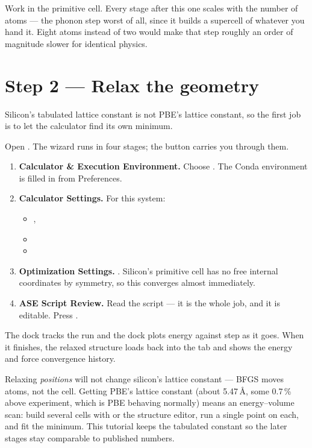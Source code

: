 \begin{caltip}
Work in the primitive cell. Every stage after this one scales with the number
of atoms --- the phonon step worst of all, since it builds a supercell of
whatever you hand it. Eight atoms instead of two would make that step roughly
an order of magnitude slower for identical physics.
\end{caltip}

\section{Step 2 --- Relax the geometry}

Silicon's tabulated lattice constant is not PBE's lattice constant, so the
first job is to let the calculator find its own minimum.

Open \menusep{}. The wizard
runs in four stages; the  button carries you through them.

\begin{enumerate}
  \item \textbf{Calculator \& Execution Environment.} Choose . The
    Conda environment is filled in from Preferences.
  \item \textbf{Calculator Settings.} For this system:
    \begin{itemize}
      \item {} ,  
      \item {} 
      \item {} 
    \end{itemize}
  \item \textbf{Optimization Settings.} 
    . Silicon's primitive cell has no free internal
    coordinates by symmetry, so this converges almost immediately.
  \item \textbf{ASE Script Review.} Read the script --- it is the whole job,
    and it is editable. Press .
\end{enumerate}

The  dock tracks the run and the  dock plots energy
against step as it goes. When it finishes, the relaxed structure loads back
into the tab and \menusep{}
shows the energy and force convergence history.

\begin{calnote}
Relaxing \emph{positions} will not change silicon's lattice constant --- BFGS
moves atoms, not the cell. Getting PBE's lattice constant (about 5.47\,\AA,
some 0.7\,\% above experiment, which is PBE behaving normally) means an
energy--volume scan: build several cells with
\menusep{} or the structure editor, run a
single point on each, and fit the minimum. This tutorial keeps the tabulated
constant so the later stages stay comparable to published numbers.
\end{calnote}

